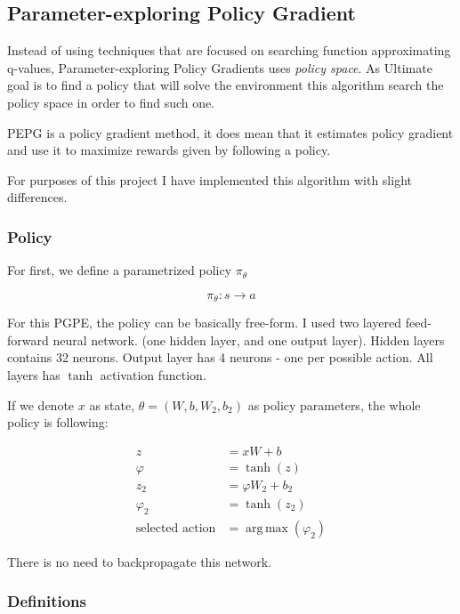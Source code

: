\documentclass[12pt]{article}
\DeclareMathOperator*{\argmax}{arg\,max}
\begin{document}
\subsection{Parameter-exploring Policy Gradient}
Instead of using techniques that are focused on searching function approximating q-values, Parameter-exploring Policy Gradients\cite{pgpe} uses \emph{policy space}. As Ultimate goal is to find a policy that will solve the environment this algorithm search the policy space in order to find such one.

PEPG is a policy gradient method, it does mean that it estimates policy gradient and use it to maximize rewards given by following a policy.

For purposes of this project I have implemented this algorithm with slight differences.

\subsubsection{Policy}

For first, we define a parametrized policy $\pi_\theta$

\begin{equation}
\pi_\theta: s \rightarrow a
\end{equation}

For this PGPE, the policy can be basically free-form. I used two layered feed-forward neural network. (one hidden layer, and one output layer).
Hidden layers contains 32 neurons. Output layer has 4 neurons - one per possible action. All layers has $\tanh$ activation function.

If we denote $x$ as state, $\theta = (W,b,W_2,b_2)$ as policy parameters, the whole policy is following:

\begin{equation}
\begin{aligned}
z &= xW + b \\
\varphi &= \tanh(z) \\
z_2 &= \varphi W_2 + b_2 \\
\varphi_2 &= \tanh(z_2) \\
\text{selected action} &= \argmax(\varphi_2)
\end{aligned}
\end{equation}

There is no need to backpropagate this network.

\subsubsection{Definitions}
\end{document}
